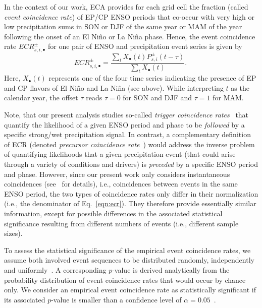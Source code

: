 \documentclass[utf8]{frontiersSCNS} %
\begin{document}
In the context of our work, ECA provides for each grid cell the fraction (called \textit{event coincidence rate}) of EP/CP ENSO periods that co-occur with very high or low precipitation sums in SON or DJF of the same year or MAM of the year following the onset of an El Ni\~no or La Ni\~na phase. Hence, the event coincidence rate $ECR^\pm_{s,i,\bullet}$ for one pair of ENSO and precipitation event
series is given by
\begin{equation}
    ECR^\pm_{s,i,\bullet} = \frac{\sum_t X_{\bullet}(t)P^\pm_{s,i}(t - \tau)}{\sum_t
      X_\bullet(t)}.~\label{eqn:ecr}
\end{equation}
Here, $X_{\bullet}(t)$ represents one of the four time series indicating the presence of EP and CP flavors of El Ni\~no and La Ni\~na (see above). While interpreting $t$ as the calendar year, the offset $\tau$ reads $\tau=0$ for SON and DJF and $\tau=1$ for MAM. 

Note, that our present analysis studies so-called {\em trigger coincidence rates}~\citep{Donges2016a} that quantify the likelihood of a given ENSO period and phase to be {\em followed} by a specific strong/wet precipitation signal. In contrast, a complementary definition of ECR (denoted {\em precursor coincidence rate}~\citep{Donges2016a}) would address the inverse problem of quantifying likelihoods that a given precipitation event (that could arise through a variety of conditions and drivers) is {\em preceded} by a specific ENSO period and phase. However, since our present work only considers instantaneous coincidences (see~\cite{Donges2016a} for details), i.e., coincidences between events in the same ENSO period, the two types of coincidence rates only differ in their normalization (i.e., the denominator of Eq.~\eqref{eqn:ecr}). They therefore provide essentially similar information, except for possible differences in the associated statistical significance resulting from different numbers of events (i.e., different sample sizes). 

To assess the statistical significance of the empirical event coincidence rates, we assume both involved event sequences to be distributed randomly, independently and uniformly~\citep{donges_nonlinear_2011,Donges2016a}. A corresponding $p$-value is derived analytically from the probability distribution of event coincidence rates that would occur by chance only. We consider an empirical event coincidence rate as statistically significant if its associated $p$-value is smaller than a confidence level of $\alpha=0.05$~\citep{Donges2016a}.
\end{document}
